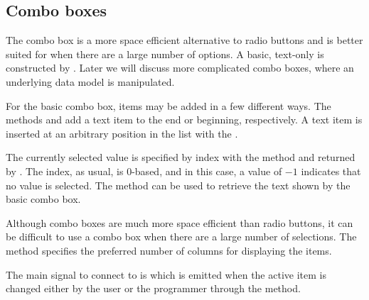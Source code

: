 \subsection{Combo boxes}
\label{sec:RGtk2:basic-combobox}

The combo box is a more space efficient alternative to radio buttons
and is better suited for when there are a large number of options. A
basic, text-only  is constructed by
. Later we will discuss more
complicated combo boxes, where an underlying data model is
manipulated.

For the basic combo box, items may be added in a few different ways.
The methods  and
 add a text item to the end or
beginning, respectively.  A text item is inserted at an arbitrary
position in the list with the .

The currently selected value is specified by index with the method
 and returned by
. The index, as usual, is $0$-based,
and in this case, a value of $-1$ indicates that no value is selected.
The  method can be used to retrieve
the text shown by the basic combo box.

Although combo boxes are much more space efficient than radio buttons,
it can be difficult to use a combo box when there are a large number
of selections. The  method specifies
the preferred number of columns for displaying the items.


The main signal to connect to is  which is emitted
when the active item is changed either by the user or the programmer
through the  method.

